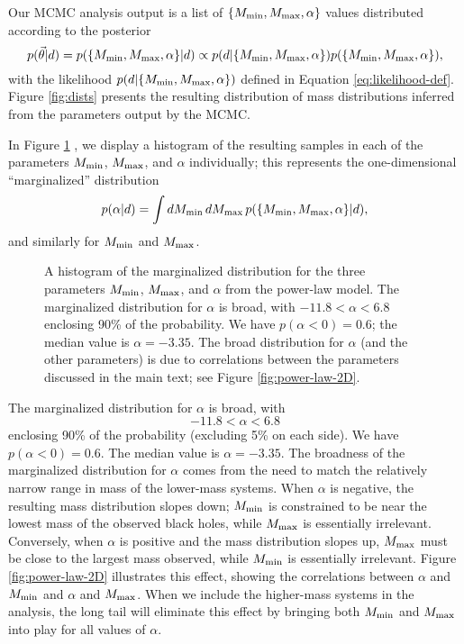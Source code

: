 \documentclass[preprint]{aastex}
\newcommand{\Mmin}{M_{\textnormal{min}}}
\newcommand{\Mmax}{M_{\textnormal{max}}}
\newcommand{\vtheta}{\vec{\theta}}
\begin{document}
Our MCMC analysis output is a list of $\{\Mmin, \Mmax, \alpha\}$
values distributed according to the posterior 
\begin{equation}
  p(\vtheta|d) = p(\{\Mmin, \Mmax, \alpha\}|d) \propto p(d|\{\Mmin,
  \Mmax, \alpha\}) p(\{\Mmin, \Mmax, \alpha\}),
\end{equation}
with the likelihood $p(d|\{\Mmin, \Mmax, \alpha\})$ defined in
Equation \eqref{eq:likelihood-def}.  Figure \ref{fig:dists} presents
the resulting distribution of mass distributions inferred from the
parameters output by the MCMC.

In Figure \ref{fig:power-law} , we display a histogram of the resulting
samples in each of the parameters $\Mmin$, $\Mmax$, and $\alpha$
individually; this represents the one-dimensional ``marginalized''
distribution
\begin{equation}
  \label{eq:alpha-pdf}
  p(\alpha|d) = \int d\Mmin\, d\Mmax\, p(\{\Mmin, \Mmax, \alpha\}|d),
\end{equation}
and similarly for $\Mmin$ and $\Mmax$.

\begin{figure}
  \begin{center}
  \end{center}
  \caption{\label{fig:power-law} A histogram of the marginalized
    distribution for the three parameters $\Mmin$, $\Mmax$, and
    $\alpha$ from the power-law model.  The marginalized distribution
    for $\alpha$ is broad, with $-11.8 < \alpha < 6.8$ enclosing 90\%
    of the probability.  We have $p(\alpha < 0) = 0.6$; the median
    value is $\alpha = -3.35$.  The broad distribution for $\alpha$
    (and the other parameters) is due to correlations between the
    parameters discussed in the main text; see Figure
    \ref{fig:power-law-2D}.}
\end{figure}

The marginalized distribution for $\alpha$ is broad, with
\begin{equation}
  -11.8 < \alpha < 6.8
\end{equation}
enclosing 90\% of the probability (excluding 5\% on each side).  We
have $p(\alpha < 0) = 0.6$.  The median value is $\alpha = -3.35$.
The broadness of the marginalized distribution for $\alpha$ comes from
the need to match the relatively narrow range in mass of the
lower-mass systems.  When $\alpha$ is negative, the resulting mass
distribution slopes down; $\Mmin$ is constrained to be near the lowest
mass of the observed black holes, while $\Mmax$ is essentially
irrelevant.  Conversely, when $\alpha$ is positive and the mass
distribution slopes up, $\Mmax$ must be close to the largest mass
observed, while $\Mmin$ is essentially irrelevant.  Figure
\ref{fig:power-law-2D} illustrates this effect, showing the
correlations between $\alpha$ and $\Mmin$ and $\alpha$ and $\Mmax$.
When we include the higher-mass systems in the analysis, the long tail
will eliminate this effect by bringing both $\Mmin$ and $\Mmax$ into
play for all values of $\alpha$.
\end{document}
